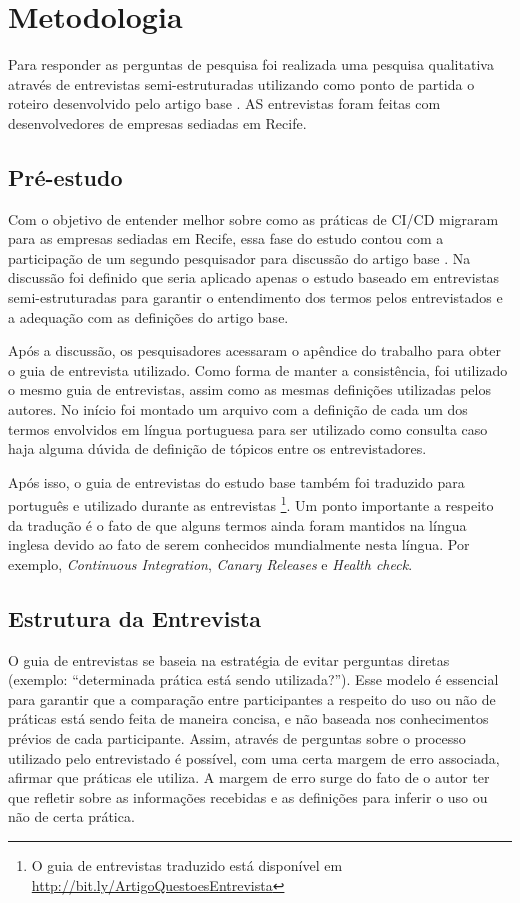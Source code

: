 
\section{Metodologia}

Para responder as perguntas de pesquisa foi realizada uma pesquisa qualitativa através de entrevistas semi-estruturadas utilizando como ponto de partida o roteiro desenvolvido pelo artigo base \cite{empiricalStudy2016}. AS entrevistas foram feitas com desenvolvedores de empresas sediadas em Recife.


\subsection{Pré-estudo}

Com o objetivo de entender melhor sobre como as práticas de CI/CD migraram para as empresas sediadas em Recife, essa fase do estudo contou com a participação de um segundo pesquisador para discussão do artigo base \cite{empiricalStudy2016}. Na discussão foi definido que seria aplicado apenas o estudo baseado em entrevistas semi-estruturadas para garantir o entendimento dos termos pelos entrevistados e a adequação com as definições do artigo base. 

Após a discussão, os pesquisadores acessaram o apêndice do trabalho para obter o guia de entrevista utilizado. Como forma de manter a consistência, foi utilizado o mesmo guia de entrevistas, assim como as mesmas definições utilizadas pelos autores. No início foi montado um arquivo com a definição de cada um dos termos envolvidos em língua portuguesa para ser utilizado como consulta caso haja alguma dúvida de definição de tópicos entre os entrevistadores.

Após isso, o guia de entrevistas do estudo base também foi traduzido para português e utilizado durante as entrevistas \footnote{O guia de entrevistas traduzido está disponível em \url{http://bit.ly/ArtigoQuestoesEntrevista}}. Um ponto importante a respeito da tradução é o fato de que alguns termos ainda foram mantidos na língua inglesa devido ao fato de serem conhecidos mundialmente nesta língua. Por exemplo, \emph{Continuous Integration}, \emph{Canary Releases} e \emph{Health check}.


\subsection{Estrutura da Entrevista}

O guia de entrevistas se baseia na estratégia de evitar perguntas diretas (exemplo: “determinada prática está sendo utilizada?”). Esse modelo é essencial para garantir que a comparação entre participantes a respeito do uso ou não de práticas está sendo feita de maneira concisa, e não baseada nos conhecimentos prévios de cada participante. Assim, através de perguntas sobre o processo utilizado pelo entrevistado é possível, com uma certa margem de erro associada, afirmar que práticas ele utiliza. A margem de erro surge do fato de o autor ter que refletir sobre as informações recebidas e as definições para inferir o uso ou não de certa prática.

